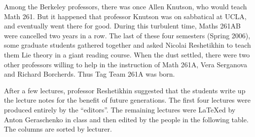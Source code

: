    Among the Berkeley professors, there was once
  Allen Knutson, who would teach Math 261. But it happened that
  professor Knutson was on sabbatical at UCLA, and eventually went there for good. During
  this turbulent time, Maths 261AB were cancelled two years in a row. The last of these
  four semesters (Spring 2006), some graduate students gathered together and asked
  Nicolai Reshetikhin to teach them Lie theory in a giant reading course. When the dust
  settled, there were two other professors willing to help in the instruction of Math
  261A, Vera Serganova and Richard Borcherds. Thus Tag Team 261A was born.

  After a few lectures, professor Reshetikhin suggested that the students write up the
  lecture notes for the benefit of future generations. The first four lectures were
  produced entirely by the ``editors''. The remaining lectures were \LaTeX ed
   by Anton Geraschenko in class and then edited by the people in
  the following table. The columns are sorted by lecturer.

  \bigskip

